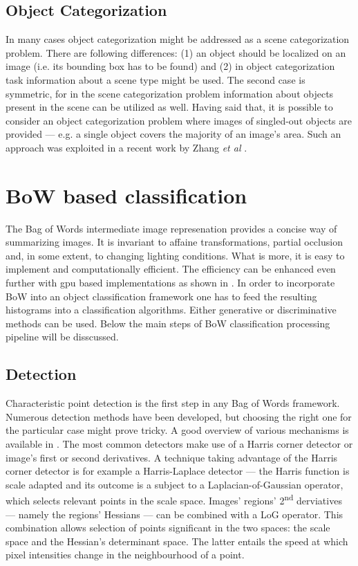 \documentclass[a4paper,12pt]{article}
\begin{document}
  \subsection{Object Categorization}
  
  In many cases object categorization might be addressed as a scene categorization problem. There are following differences: (1) an object should be localized on an image (i.e. its bounding box has to be found) and (2) in object categorization task information about a scene type might be used. The second case is symmetric, for in the scene categorization problem information about objects present in the scene can be utilized as well. Having said that, it is possible to consider an object categorization problem where images of singled-out objects are provided --- e.g. a single object covers the majority of an image's area. Such an approach was exploited in a recent work by Zhang \emph{et al} \cite{zhangcategory}. 
  

\section{BoW based classification}

	The Bag of Words intermediate image represenation provides a concise way of summarizing images. It is invariant to affaine transformations, partial occlusion and, in some extent, to changing lighting conditions. What is more, it is easy to implement and computationally efficient. The efficiency can be enhanced even further with gpu based implementations as shown in \cite{van2011empowering}. In order to incorporate BoW into an object classification framework one has to feed the resulting histograms into a classification algorithms. Either generative or discriminative methods can be used. Below the main steps of BoW classification processing pipeline will be disscussed.

\subsection{Detection}

	Characteristic point detection is the first step in any Bag of Words framework. Numerous detection methods have been developed, but choosing the right one for the particular case might prove tricky. A good overview of various mechanisms is available in \cite{tsai2012bag}. The most common detectors make use of a Harris corner detector or image's first or second derivatives. A technique taking advantage of the Harris corner detector is for example a Harris-Laplace detector --- the Harris function is scale adapted and its outcome is a subject to a Laplacian-of-Gaussian operator, which selects relevant points in the scale space. Images' regions' 2\textsuperscript{nd} derviatives --- namely the regions' Hessians --- can be combined with a LoG operator. This combination allows selection of points significant in the two spaces: the scale space and the Hessian's determinant space. The latter entails the speed at which pixel intensities change in the neighbourhood of a point.	
	
\end{document}
